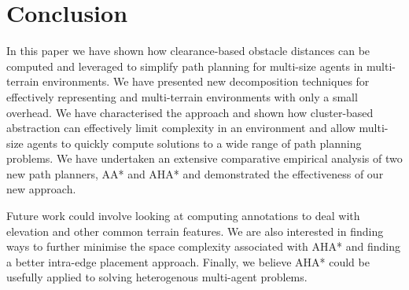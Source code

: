 \section{Conclusion}
In this paper we have shown how clearance-based obstacle distances can be computed and leveraged to simplify path planning for multi-size agents in multi-terrain environments. 
We have presented new decomposition techniques for effectively representing and multi-terrain environments with only a small overhead.
We have characterised the approach and shown how cluster-based abstraction can effectively limit complexity in an environment and allow multi-size agents to quickly compute solutions to a wide range of path planning problems. 
We have undertaken an extensive comparative empirical analysis of two new path planners, AA* and AHA* and demonstrated the effectiveness of our new approach. 
\par \indent
Future work could involve looking at computing annotations to deal with elevation and other common terrain features. We are also interested in finding ways to further minimise the space complexity associated with AHA* and finding a better intra-edge placement approach. Finally, we believe AHA* could be usefully applied to solving heterogenous multi-agent problems.
